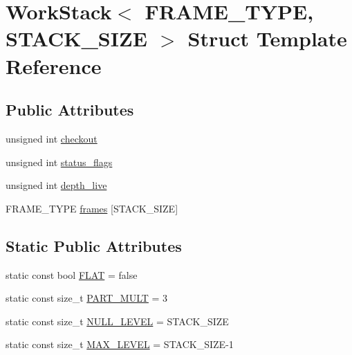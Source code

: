 \hypertarget{structWorkStack}{\section{Work\-Stack$<$ F\-R\-A\-M\-E\-\_\-\-T\-Y\-P\-E, S\-T\-A\-C\-K\-\_\-\-S\-I\-Z\-E $>$ Struct Template Reference}
\label{structWorkStack}
}
\subsection*{Public Attributes}
\begin{DoxyCompactItemize}
\item 
unsigned int \hyperlink{structWorkStack_a9d601145d872243d3b6370c5e5bf1e34}{checkout}
\item 
unsigned int \hyperlink{structWorkStack_af135e2c1844ca4a3591b5456cf4c5850}{status\-\_\-flags}
\item 
unsigned int \hyperlink{structWorkStack_adb939c1d0f197b8c7cb5d8fd4c0b9051}{depth\-\_\-live}
\item 
F\-R\-A\-M\-E\-\_\-\-T\-Y\-P\-E \hyperlink{structWorkStack_acd16ce9936822777e6eafead438d3865}{frames} \mbox{[}S\-T\-A\-C\-K\-\_\-\-S\-I\-Z\-E\mbox{]}
\end{DoxyCompactItemize}
\subsection*{Static Public Attributes}
\begin{DoxyCompactItemize}
\item 
static const bool \hyperlink{structWorkStack_a431ac90dabf554864d52e73c7c90dbe5}{F\-L\-A\-T} = false
\item 
static const size\-\_\-t \hyperlink{structWorkStack_ac6cc950caebc53a6a6312f7c436a5ad8}{P\-A\-R\-T\-\_\-\-M\-U\-L\-T} = 3
\item 
static const size\-\_\-t \hyperlink{structWorkStack_a5b5d945dac8430553d7b57dab4104f61}{N\-U\-L\-L\-\_\-\-L\-E\-V\-E\-L} = S\-T\-A\-C\-K\-\_\-\-S\-I\-Z\-E
\item 
static const size\-\_\-t \hyperlink{structWorkStack_a785256dcd178410e2ea2bf3ea595d87d}{M\-A\-X\-\_\-\-L\-E\-V\-E\-L} = S\-T\-A\-C\-K\-\_\-\-S\-I\-Z\-E-\/1
\end{DoxyCompactItemize}


